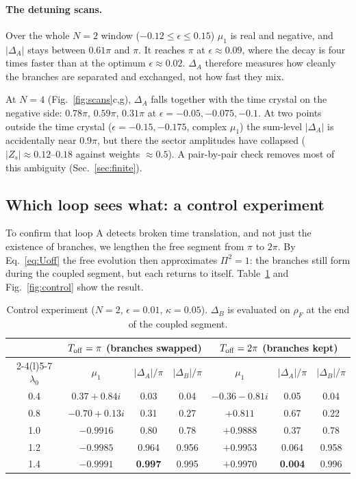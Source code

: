 \documentclass[11pt,a4paper]{article}
\begin{document}
\paragraph{The detuning scans.} Over the whole $N=2$ window ($-0.12\le\epsilon\le0.15$) $\mu_1$
is real and negative, and $|\Delta_A|$ stays between $0.61\pi$ and $\pi$. It reaches $\pi$ at
$\epsilon\approx0.09$, where the decay is four times faster than at the optimum $\epsilon\approx0.02$.
$\Delta_A$ therefore measures how cleanly the branches are separated and exchanged, not how fast
they mix.

At $N=4$ (Fig.~\ref{fig:scans}c,g), $\Delta_A$ falls together with the time crystal on the
negative side: $0.78\pi$, $0.59\pi$, $0.31\pi$ at $\epsilon=-0.05,-0.075,-0.1$. At two points
outside the time crystal ($\epsilon=-0.15,-0.175$, complex $\mu_1$) the sum-level $|\Delta_A|$ is
accidentally near $0.9\pi$, but there the sector amplitudes have collapsed
($|Z_s|\approx0.12$–$0.18$ against weights $\approx0.5$). A pair-by-pair check removes most of
this ambiguity (Sec.~\ref{sec:finite}).

\subsection{Which loop sees what: a control experiment}

To confirm that loop A detects broken time translation, and not just the existence of branches,
we lengthen the free segment from $\pi$ to $2\pi$. By Eq.~\eqref{eq:Uoff} the free evolution then
approximates $\Pi^2=1$: the branches still form during the coupled segment, but each returns to
itself. Table~\ref{tab:control} and Fig.~\ref{fig:control} show the result.

\begin{table}[h]
\centering
\begin{tabular}{@{}c ccc ccc@{}}
\toprule
& \multicolumn{3}{c}{$T_{\rm off}=\pi$ (branches swapped)} & \multicolumn{3}{c}{$T_{\rm off}=2\pi$ (branches kept)}\\
\cmidrule(lr){2-4}\cmidrule(l){5-7}
$\lambda_0$ & $\mu_1$ & $|\Delta_A|/\pi$ & $|\Delta_B|/\pi$ & $\mu_1$ & $|\Delta_A|/\pi$ & $|\Delta_B|/\pi$\\
\midrule
0.4 & $0.37+0.84i$ & 0.03 & 0.04 & $-0.36-0.81i$ & 0.05 & 0.04\\
0.8 & $-0.70+0.13i$ & 0.31 & 0.27 & $+0.811$ & 0.67 & 0.22\\
1.0 & $-0.9916$ & 0.80 & 0.78 & $+0.9888$ & 0.37 & 0.78\\
1.2 & $-0.9985$ & 0.964 & 0.956 & $+0.9953$ & 0.064 & 0.958\\
1.4 & $-0.9991$ & \textbf{0.997} & 0.995 & $+0.9970$ & \textbf{0.004} & 0.996\\
\bottomrule
\end{tabular}
\caption{Control experiment ($N=2$, $\epsilon=0.01$, $\kappa=0.05$). $\Delta_B$ is evaluated on
$\rho_F$ at the end of the coupled segment.}
\label{tab:control}
\end{table}
\end{document}
